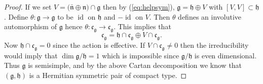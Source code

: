 \documentclass[10pt,a4paper]{amsart}
\begin{document}
\begin{proof}
If we set $V=\mathfrak{(\bar{n}\oplus \mathfrak{n)\cap \mathfrak{g}}}$ then by (\ref{eq:helpsym}), $%
\mathfrak{g}=\mathfrak{h}\oplus V$ with $[V,V]\subset \mathfrak{h}$. Define $%
\theta :\mathfrak{g}\rightarrow \mathfrak{g}$ to be $\operatorname{id}$ on $\mathfrak{h}$
and $-\operatorname{id}$ on $V$. Then $\theta $ defines an involutive automorphism of $%
\mathfrak{g}$ hence $\theta :\mathfrak{c}_{\mathfrak{g}}\rightarrow
\mathfrak{c}_{\mathfrak{g}}$. This implies that%
\[
\mathfrak{c}_{\mathfrak{g}}=\mathfrak{h}\cap \mathfrak{c}_{\mathfrak{g}%
}\oplus V\cap \mathfrak{c}_{\mathfrak{g}}\text{.}
\]%
Now $\mathfrak{h}\cap \mathfrak{c}_{\mathfrak{g}}=0$ since the action is
effective. If $V\cap \mathfrak{c}_{\mathfrak{g}}\neq 0$ then the
irreducibility would imply that $\dim \mathfrak{g}/\mathfrak{h}=1$ which is
impossible since $\mathfrak{g}/\mathfrak{h}$ is even dimensional. Thus $%
\mathfrak{g}$ is semisimple, and by the above  Cartan decomposition we know that $(\mathfrak{g}, \mathfrak{h})$
is a Hermitian symmetric pair of compact type.
\end{proof}
\end{document}
